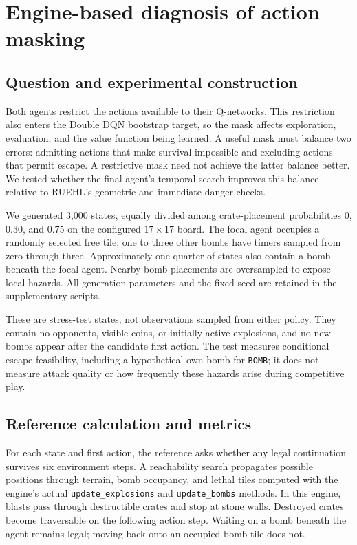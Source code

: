 \section{Engine-based diagnosis of action masking}
\label{sec:jesper-mask-audit}

\subsection{Question and experimental construction}
Both agents restrict the actions available to their Q-networks. This
restriction also enters the Double DQN bootstrap target, so the mask
affects exploration, evaluation, and the value function being learned.
A useful mask must balance two errors: admitting actions that make
survival impossible and excluding actions that permit escape. A restrictive
mask need not achieve the latter balance better. We tested whether the
final agent's temporal search improves this balance relative to RUEHL's
geometric and immediate-danger checks.

We generated 3,000 states, equally divided among crate-placement
probabilities 0, 0.30, and 0.75 on the configured $17\times17$ board.
The focal agent occupies a randomly selected free tile; one to three other
bombs have timers sampled from zero through three. Approximately one
quarter of states also contain a bomb beneath the focal agent. Nearby
bomb placements are oversampled to expose local hazards. All generation
parameters and the fixed seed are retained in the supplementary scripts.

These are stress-test states, not observations sampled from either policy.
They contain no opponents, visible coins, or initially active explosions,
and no new bombs appear after the candidate first action. The test measures
conditional escape feasibility, including a hypothetical own bomb for
\texttt{BOMB}; it does not measure attack quality or how frequently these
hazards arise during competitive play.

\subsection{Reference calculation and metrics}
For each state and first action, the reference asks whether any legal
continuation survives six environment steps. A reachability search
propagates possible positions through terrain, bomb occupancy, and lethal
tiles computed with the engine's actual \texttt{update\_explosions} and
\texttt{update\_bombs} methods. In this engine, blasts pass through
destructible crates and stop at stone walls. Destroyed crates become
traversable on the following action step. Waiting on a bomb beneath the
agent remains legal; moving back onto an occupied bomb tile does not.

